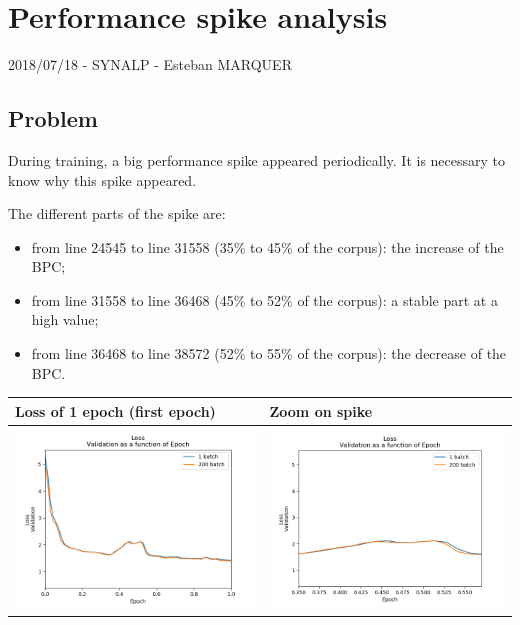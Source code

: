 \section*{Performance spike analysis}

2018/07/18 - SYNALP - Esteban MARQUER

\subsection{Problem}

During training, a big performance spike appeared periodically. It is
necessary to know why this spike appeared.

The different parts of the spike are:
\begin{itemize}
\item from line 24545 to line 31558 (35\% to 45\% of the corpus): the increase of the BPC;
\item from line 31558 to line 36468 (45\% to 52\% of the corpus): a stable part at a high value;
\item from line 36468 to line 38572 (52\% to 55\% of the corpus): the decrease of the BPC.
\end{itemize}

\begin{longtable}[]{@{}ll@{}}
\hline
Loss of 1 epoch (first epoch) & Zoom on spike\tabularnewline
\hline
\endhead
\includegraphics[width=.45\textwidth]{parts/appendix/reports-papud/2018_07_18-Performance_spike_analysis/loss_valid.png} &
\includegraphics[width=.45\textwidth]{parts/appendix/reports-papud/2018_07_18-Performance_spike_analysis/loss_valid_part.png}\tabularnewline
\hline
\end{longtable}

